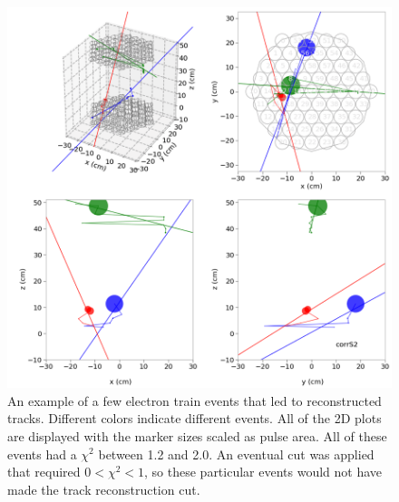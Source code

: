 \begin{figure}[htbp]
\begin{center}
\includegraphics[width=\textwidth]{figures/lips/tracks_etrain.png}
\caption{An example of a few electron train events that led to reconstructed tracks. Different colors indicate different events. All of the 2D plots are displayed with the marker sizes scaled as pulse area. All of these events had a $\chi^{2}$ between 1.2 and 2.0. An eventual cut was applied that required $0 < \chi^{2} < 1$, so these particular events would not have made the track reconstruction cut. }
\label{fig:tracks_etrain}
\end{center}
\end{figure}

